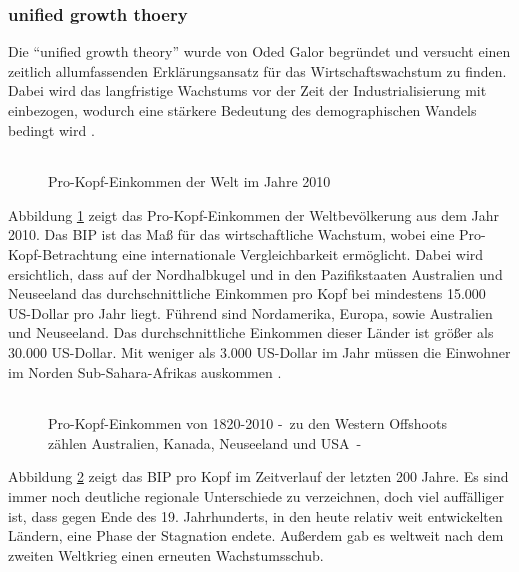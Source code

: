 \subsubsection*{unified growth thoery}\label{Unified}
Die "`unified growth theory"' wurde von Oded Galor begründet und versucht einen zeitlich allumfassenden Erklärungsansatz für das Wirtschaftswachstum zu finden. Dabei wird das langfristige Wachstums vor der Zeit der Industrialisierung mit einbezogen, wodurch eine stärkere Bedeutung des demographischen Wandels bedingt wird \cite{Galor.2011}.
%
	\begin{figure}[h!]
 		\centering 
		 \begin{tabular}{@{}r@{}} 
 		\end{tabular}  
		\caption[Pro-Kopf-Einkommen der Welt 2010]{Pro-Kopf-Einkommen der Welt im Jahre 2010}\label{KarteEinkommen}
	\end{figure}
%
Abbildung \ref{KarteEinkommen} zeigt das Pro-Kopf-Einkommen der Weltbevölkerung aus dem Jahr 2010. Das BIP ist das Maß für das wirtschaftliche Wachstum, wobei eine Pro-Kopf-Betrachtung eine internationale Vergleichbarkeit ermöglicht. Dabei wird ersichtlich, dass auf der Nordhalbkugel und in den Pazifikstaaten Australien und Neuseeland das durchschnittliche Einkommen pro Kopf bei mindestens 15.000 US-Dollar pro Jahr liegt. Führend sind Nordamerika, Europa, sowie Australien und Neuseeland. Das durchschnittliche Einkommen dieser Länder ist größer als 30.000 US-Dollar. Mit weniger als 3.000 US-Dollar im Jahr müssen die Einwohner im Norden Sub-Sahara-Afrikas auskommen \cite[Kapitel 1]{Galor.2014}.\\
%		
		\begin{figure}[h!]
			\centering 
				\begin{tabular}{@{}r@{}}  
				\end{tabular}  
			\caption[Pro-Kopf-Einkommen 1820-2010]{Pro-Kopf-Einkommen von 1820-2010 -~zu den Western Offshoots zählen Australien, Kanada, Neuseeland und USA~-}\label{BIP200Jahre}
		\end{figure}
%		
Abbildung \ref{BIP200Jahre} zeigt das BIP pro Kopf im Zeitverlauf der letzten 200 Jahre. Es sind immer noch deutliche regionale Unterschiede zu verzeichnen, doch viel auffälliger ist, dass gegen Ende des 19. Jahrhunderts, in den heute relativ weit entwickelten Ländern, eine Phase der Stagnation endete. Außerdem gab es weltweit nach dem zweiten Weltkrieg einen erneuten Wachstumsschub.
